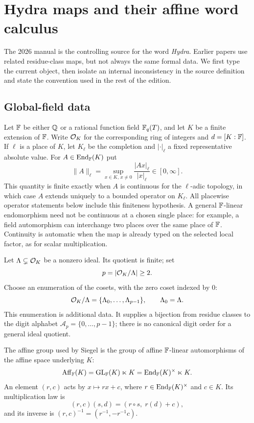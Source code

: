 \section{Hydra maps and their affine word calculus}
\label{sec:hydra-maps}

The 2026 manual is the controlling source for the word \emph{Hydra}.  Earlier
papers use related residue-class maps, but not always the same formal data.
We first type the current object, then isolate an internal inconsistency in
the source definition and state the convention used in the rest of the
edition.

\subsection{Global-field data}

Let $\mathbb F$ be either $\mathbb Q$ or a rational function field $\mathbb F_q(T)$, and let $K$
be a finite extension of $\mathbb F$.  Write $\mathcal O_K$ for the corresponding ring of
integers and $d=[K:\mathbb F]$.  If $\ell$ is a place of $K$, let $K_\ell$ be the
completion and $|\cdot|_\ell$ a fixed representative absolute value.  For
$A\in\operatorname{End}_\mathbb F(K)$ put
\begin{equation}
\label{eq:place-operator-seminorm}
 \|A\|_\ell=\sup_{x\in K,\,x\ne0}\frac{|Ax|_\ell}{|x|_\ell}
 \in[0,\infty].
\end{equation}
This quantity is finite exactly when $A$ is continuous for the $\ell$-adic
topology, in which case $A$ extends uniquely to a bounded operator on
$K_\ell$.  All placewise operator statements below include this finiteness
hypothesis.  A general $\mathbb F$-linear endomorphism need not be continuous at a
chosen single place: for example, a field automorphism can interchange two
places over the same place of $\mathbb F$.  Continuity is automatic when the map is
already typed on the selected local factor, as for scalar multiplication.

Let $\Lambda\subsetneq\mathcal O_K$ be a nonzero ideal.  Its quotient is finite; set
\[
 p=|\mathcal O_K/\Lambda|\geq2.
\]
Choose an enumeration of the cosets, with the zero coset indexed by $0$:
\[
 \mathcal O_K/\Lambda=\{\Lambda_0,\ldots,\Lambda_{p-1}\},\qquad
 \Lambda_0=\Lambda.
\]
This enumeration is additional data.  It supplies a bijection from residue
classes to the digit alphabet $\mathcal A_p=\{0,\ldots,p-1\}$; there is no
canonical digit order for a general ideal quotient.

\begin{definition}
The affine group used by Siegel is the group of affine $\mathbb F$-linear
automorphisms of the affine space underlying $K$:
\[
 \operatorname{Aff}_\mathbb F(K)=\operatorname{GL}_\mathbb F(K)\ltimes K
            =\operatorname{End}_\mathbb F(K)^\times\ltimes K.
\]
An element $(r,c)$ acts by $x\mapsto rx+c$, where
$r\in\operatorname{End}_\mathbb F(K)^\times$ and $c\in K$.  Its multiplication law is
\begin{equation}
\label{eq:affine-product}
 (r,c)(s,d)=(r\circ s,\;r(d)+c),
\end{equation}
and its inverse is $(r,c)^{-1}=(r^{-1},-r^{-1}c)$.
\end{definition}

